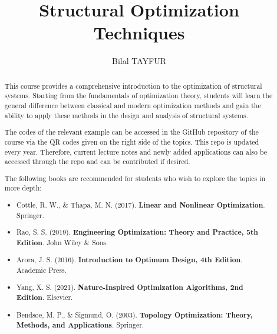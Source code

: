 \documentclass{article}
\title{Structural Optimization Techniques}
\author{Bilal TAYFUR}
\begin{document}
\begin{titlepage}
\thispagestyle{empty}
\maketitle

\begin{abstract}
This course provides a comprehensive introduction to the optimization of structural systems. Starting from the fundamentals of optimization theory, students will learn the general difference between classical and modern optimization methods and gain the ability to apply these methods in the design and analysis of structural systems. 

The codes of the relevant example can be accessed in the GitHub repository of the course via the QR codes given on the right side of the topics. This repo is updated every year. Therefore, current lecture notes and newly added applications can also be accessed through the repo and can be contributed if desired.

\vspace{10pt}
\begin{center}
\end{center}



\vspace{10pt}
\noindent The following books are recommended for students who wish to explore the topics in more depth:

\begin{itemize}
    \item Cottle, R. W., \& Thapa, M. N. (2017). \textbf{Linear and Nonlinear Optimization}. Springer.
    \item Rao, S. S. (2019). \textbf{Engineering Optimization: Theory and Practice, 5th Edition}. John Wiley \& Sons.
    \item Arora, J. S. (2016). \textbf{Introduction to Optimum Design, 4th Edition}. Academic Press.
    \item Yang, X. S. (2021). \textbf{Nature-Inspired Optimization Algorithms, 2nd Edition}. Elsevier.
    \item Bendsøe, M. P., \& Sigmund, O. (2003). \textbf{Topology Optimization: Theory, Methods, and Applications}. Springer.
\end{itemize}

\end{abstract}

\setcounter{tocdepth}{3}
\tableofcontents
\end{titlepage}















%
\end{document}
